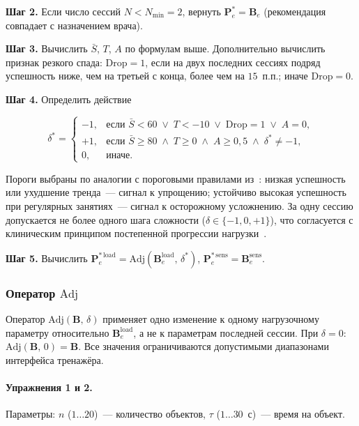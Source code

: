 \textbf{Шаг 2.} Если число сессий $N < N_{\min} = 2$, вернуть
$\mathbf{P}^{*}_e = \mathbf{B}_e$ (рекомендация совпадает с назначением
врача).

\textbf{Шаг 3.} Вычислить $\bar{S}$, $T$, $A$ по формулам выше.
Дополнительно вычислить признак резкого спада:
$\mathrm{Drop} = 1$, если на двух последних сессиях подряд успешность
ниже, чем на третьей с конца, более чем на $15$~п.п.; иначе
$\mathrm{Drop} = 0$.

\textbf{Шаг 4.} Определить действие 

\[
\delta^{*} =
\left\{
\begin{array}{ll}
-1, & \text{если } \bar{S} < 60 \;\lor\; T < -10 \;\lor\; \mathrm{Drop} = 1 \;\lor\; A = 0, \\[6pt]
+1, & \text{если } \bar{S} \geq 80 \;\land\; T \geq 0 \;\land\; A \geq 0{,}5 \;\land\; \delta^{*} \neq -1, \\[6pt]
0, & \text{иначе.}
\end{array}
\right.
\]

Пороги выбраны по аналогии с пороговыми правилами из~\cite{noble2021,rule10}:
низкая успешность или ухудшение тренда~--- сигнал к упрощению;
устойчиво высокая успешность при регулярных занятиях~--- сигнал к
осторожному усложнению. За одну сессию допускается не более одного
шага сложности ($\delta \in \{-1, 0, +1\}$), что согласуется с
клиническим принципом постепенной прогрессии нагрузки~\cite{hall2016}.

\textbf{Шаг 5.} Вычислить
$\mathbf{P}_e^{*\,\mathrm{load}} = \mathrm{Adj}(\mathbf{B}_e^{\mathrm{load}},\, \delta^{*})$,
$\mathbf{P}_e^{*\,\mathrm{sens}} = \mathbf{B}_e^{\mathrm{sens}}$.

\subsubsection{Оператор $\mathrm{Adj}$}

Оператор $\mathrm{Adj}(\mathbf{B},\, \delta)$ применяет одно изменение
к одному нагрузочному параметру относительно $\mathbf{B}_e^{\mathrm{load}}$,
а не к параметрам последней сессии. При $\delta = 0$:
$\mathrm{Adj}(\mathbf{B},\, 0) = \mathbf{B}$. Все значения ограничиваются
допустимыми диапазонами интерфейса тренажёра.

\paragraph{Упражнения 1 и 2.}
Параметры: $n$ ($1 \ldots 20$)~--- количество объектов,
$\tau$ ($1 \ldots 30$~с)~--- время на объект.

